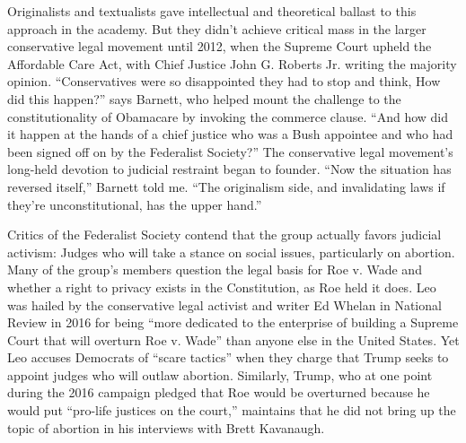 Originalists and textualists gave intellectual and theoretical ballast
to this approach in the academy. But they didn't achieve critical mass
in the larger conservative legal movement until 2012, when the Supreme
Court upheld the Affordable Care Act, with Chief Justice John G. Roberts
Jr. writing the majority opinion. ``Conservatives were so disappointed
they had to stop and think, How did this happen?'' says Barnett, who
helped mount the challenge to the constitutionality of Obamacare by
invoking the commerce clause. ``And how did it happen at the hands of a
chief justice who was a Bush appointee and who had been signed off on by
the Federalist Society?'' The conservative legal movement's long-held
devotion to judicial restraint began to founder. ``Now the situation has
reversed itself,'' Barnett told me. ``The originalism side, and
invalidating laws if they're unconstitutional, has the upper hand.''

Critics of the Federalist Society contend that the group actually favors
judicial activism: Judges who will take a stance on social issues,
particularly on abortion. Many of the group's members question the legal
basis for Roe v. Wade and whether a right to privacy exists in the
Constitution, as Roe held it does. Leo was hailed by the conservative
legal activist and writer Ed Whelan in National Review in 2016 for being
``more dedicated to the enterprise of building a Supreme Court that will
overturn Roe v. Wade'' than anyone else in the United States. Yet Leo
accuses Democrats of ``scare tactics'' when they charge that Trump seeks
to appoint judges who will outlaw abortion. Similarly, Trump, who at one
point during the 2016 campaign pledged that Roe would be overturned
because he would put ``pro-life justices on the court,'' maintains that
he did not bring up the topic of abortion in his interviews with Brett
Kavanaugh.

